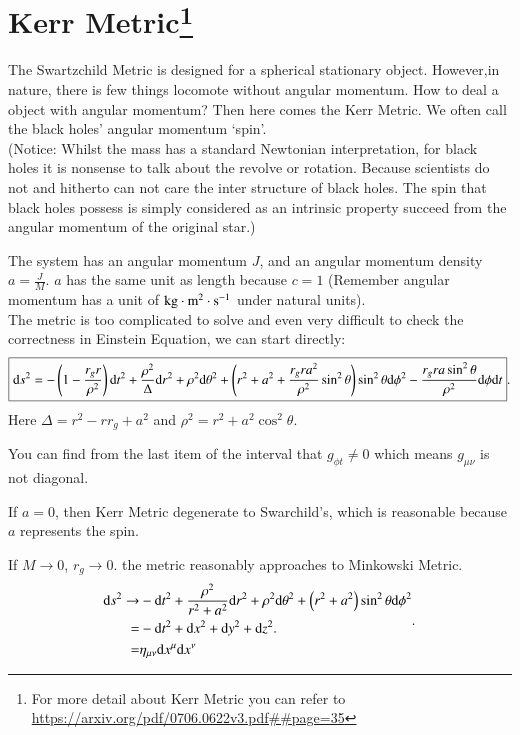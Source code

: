 \documentclass[openany,10pt]{book}
\theoremstyle{definition}
\theoremstyle{definition}
\theoremstyle{remark}
\begin{document}
\section[Kerr Metric]{Kerr Metric\footnote{For more detail about Kerr Metric you can refer to \url{https://arxiv.org/pdf/0706.0622v3.pdf##page=35}}}
The Swartzchild Metric is designed for a spherical stationary object. However,in nature, there is few things locomote without angular momentum. How to deal a object with angular momentum? Then here comes the Kerr Metric. We often call the black holes' angular momentum `spin'.\\ 
(Notice: Whilst the mass has a standard Newtonian interpretation, for black holes it is nonsense to talk about the revolve or rotation. Because scientists do not and hitherto can not care the inter structure of black holes. The spin that black holes possess is simply considered as an intrinsic property succeed from the angular momentum of the original star.) 

The system has an angular momentum $J$, and an angular momentum density  $a=\frac{J}{M}$. $a$ has the same unit as length because $c=1$ (Remember angular momentum has a unit of $\rm{kg\cdot m^2\cdot s^{-1}}$ under natural units).\\

The metric is too complicated to solve and even very difficult to check the correctness in Einstein Equation, we can start directly:
\begin{equation}
\boxed{
    {\rm d}s^2=-\left(1-\frac{r_g r}{\rho^2}\right){\rm d}t^2+\frac{\rho^2}{\Delta}{\rm d}r^2+\rho^2{\rm d}\theta^2+\left(r^2+a^2+\frac{r_gra^2}{\rho^2}\sin^2{\theta}\right)\sin^2{\theta}{\rm d}\phi^2-\frac{r_gra\sin^2{\theta}}{\rho^2}{\rm d}\phi{\rm d}t}.
\end{equation}
Here $\Delta =r^2-rr_g+a^2$ and $\rho^2=r^2+a^2\cos^2{\theta}$. 

You can find from the last item of the interval that $g_{\phi t}\neq 0$ which means $g_{\mu\nu}$ is not diagonal. 

If $a=0$, then Kerr Metric degenerate to Swarchild's, which is reasonable because $a$ represents the spin.

If $M\rightarrow 0$,  $r_g\rightarrow 0$. the metric reasonably approaches to Minkowski Metric.
\begin{equation}
\label{kerrminkowski}
\begin{aligned}
    {\rm d}s^2\rightarrow&-{\rm d}t^2+\frac{\rho^2}{r^2+a^2}{\rm d}r^2+\rho^2{\rm d}\theta^2+\left(r^2+a^2\right)\sin^2{\theta}{\rm d}\phi^2\\
    =&-{\rm d}t^2+{\rm d}x^2+{\rm d}y^2+{\rm d}z^2.\\
    =&\eta_{\mu\nu}{\rm d}x^\mu{\rm d}x^\nu
\end{aligned}.
\end{equation}
\end{document}
